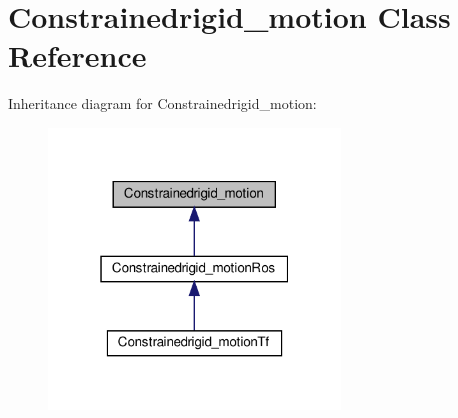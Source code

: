 \hypertarget{classConstrainedrigid__motion}{}\section{Constrainedrigid\+\_\+motion Class Reference}
\label{classConstrainedrigid__motion}


Inheritance diagram for Constrainedrigid\+\_\+motion\+:\nopagebreak
\begin{figure}[H]
\begin{center}
\leavevmode
\includegraphics[width=220pt]{d2/ded/classConstrainedrigid__motion__inherit__graph}
\end{center}
\end{figure}
